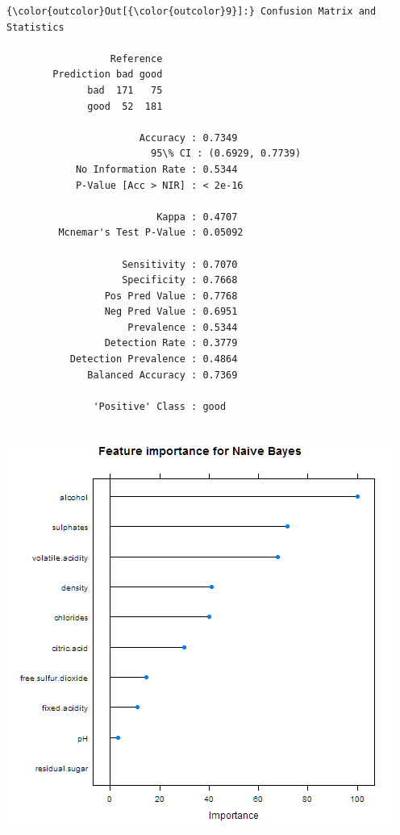 \documentclass{article}
\begin{document}
            \begin{Verbatim}[commandchars=\\\{\}]
{\color{outcolor}Out[{\color{outcolor}9}]:} Confusion Matrix and Statistics
        
                  Reference
        Prediction bad good
              bad  171   75
              good  52  181
                                                  
                       Accuracy : 0.7349          
                         95\% CI : (0.6929, 0.7739)
            No Information Rate : 0.5344          
            P-Value [Acc > NIR] : < 2e-16         
                                                  
                          Kappa : 0.4707          
         Mcnemar's Test P-Value : 0.05092         
                                                  
                    Sensitivity : 0.7070          
                    Specificity : 0.7668          
                 Pos Pred Value : 0.7768          
                 Neg Pred Value : 0.6951          
                     Prevalence : 0.5344          
                 Detection Rate : 0.3779          
           Detection Prevalence : 0.4864          
              Balanced Accuracy : 0.7369          
                                                  
               'Positive' Class : good            
                                                  
\end{Verbatim}

\includegraphics[scale=0.9]{2015-12-03-importance-nb}
\end{document}
